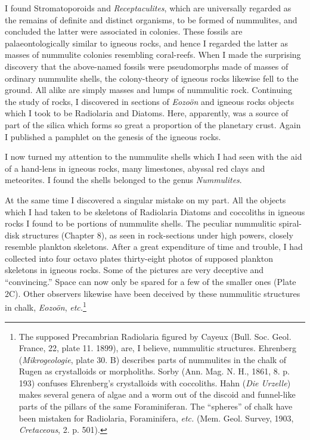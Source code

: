 \documentclass[a4paper, 12pt, oneside, landscape]{article}
\begin{document}
I found Stromatoporoids and \emph{Receptaculites}, which are universally regarded as the remains of definite and distinct organisms, to be formed of nummulites, and concluded the latter were associated in colonies. These fossils are palaeontologically similar to igneous rocks, and hence I regarded the latter as masses of nummulite colonies resembling coral-reefs. When I made the surprising discovery that the above-named fossils were pseudomorphs made of masses of ordinary nummulite shells, the colony-theory of igneous rocks likewise fell to the ground. All alike are simply masses and lumps of nummulitic rock. Continuing the study of rocks, I discovered in sections of \emph{Eozoön} and igneous rocks objects which I took to be Radiolaria and Diatoms. Here, apparently, was a source of part of the silica which forms so great a proportion of the planetary crust. Again I published a pamphlet on the genesis of the igneous rocks.

I now turned my attention to the nummulite shells which I had seen with the aid of a hand-lens in igneous rocks, many limestones, abyssal red clays and meteorites. I found the shells belonged to the genus \emph{Nummulites}.

At the same time I discovered a singular mistake on my part. All the objects which I had taken to be skeletons of Radiolaria Diatoms and coccoliths in igneous rocks I found to be portions of nummulite shells. The peculiar nummulitic spiral-disk structures (Chapter 8), as seen in rock-sections under high powers, closely resemble plankton skeletons. After a great expenditure of time and trouble, I had collected into four octavo plates thirty-eight photos of supposed plankton skeletons in igneous rocks. Some of the pictures are very deceptive and ``convincing.'' Space can now only be spared for a few of the smaller ones (Plate 2C). Other observers likewise have been deceived by these nummulitic structures in chalk, \emph{Eozoön}, \emph{etc.}\footnote{The supposed Precambrian Radiolaria figured by Cayeux (Bull. Soc. Geol. France, 22, plate 11. 1899), are, I believe, nummulitic structures. Ehrenberg (\emph{Mikrogeologie}, plate 30. B) describes parts of nummulites in the chalk of Rugen as crystalloids or morpholiths. Sorby (Ann. Mag. N. H., 1861, 8. p. 193) confuses Ehrenberg's crystalloids with coccoliths. Hahn (\emph{Die Urzelle}) makes several genera of algae and a worm out of the discoid and funnel-like parts of the pillars of the same Foraminiferan. The ``spheres'' of chalk have been mistaken for Radiolaria, Foraminifera, \emph{etc.} (Mem. Geol. Survey, 1903, \emph{Cretaceous}, 2. p. 501).}
\end{document}
